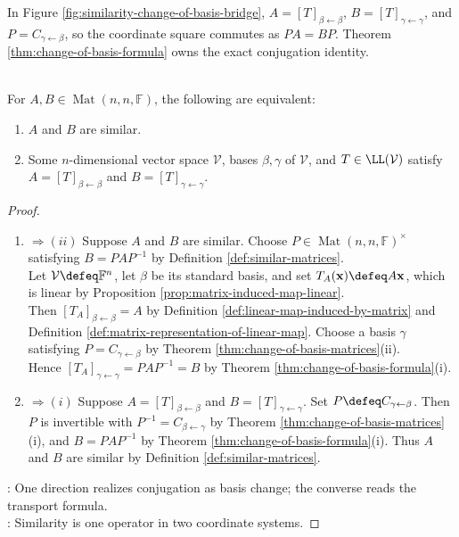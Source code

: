 In Figure \ref{fig:similarity-change-of-basis-bridge}, $A=[T]_{\beta\leftarrow\beta}$, $B=[T]_{\gamma\leftarrow\gamma}$, and $P=C_{\gamma\leftarrow\beta}$, so the coordinate square commutes as $PA=BP$. Theorem \ref{thm:change-of-basis-formula} owns the exact conjugation identity.

\begin{corollary} \label{cor:similar-iff-same-linear-operator} \\
For $A,B\in\operatorname{Mat}(n,n,\mathbb{F})$, the following are equivalent:
\begin{enumerate}[label=(\roman*)]
\setlength{\itemsep}{0pt}
\item $A$ and $B$ are similar.
\item Some $n$-dimensional vector space $\mathcal{V}$, bases $\beta,\gamma$ of $\mathcal{V}$, and $T\in\LL(\mathcal{V})$ satisfy $A=[T]_{\beta\leftarrow\beta}$ and $B=[T]_{\gamma\leftarrow\gamma}$.
\end{enumerate}
\begin{proof}
\begin{enumerate}[label=(\roman*)]
\setlength{\itemsep}{0pt}
\item[$(i)$] $\Rightarrow (ii)$ Suppose $A$ and $B$ are similar. Choose $P\in\operatorname{Mat}(n,n,\mathbb{F})^{\times}$ satisfying $B=PAP^{-1}$ by Definition \ref{def:similar-matrices}.\\
Let $\mathcal{V}\defeq\mathbb{F}^n$, let $\beta$ be its standard basis, and set $T_A(\mathbf{x})\defeq A\mathbf{x}$, which is linear by Proposition \ref{prop:matrix-induced-map-linear}.\\
Then $[T_A]_{\beta\leftarrow\beta}=A$ by Definition \ref{def:linear-map-induced-by-matrix} and Definition \ref{def:matrix-representation-of-linear-map}. Choose a basis $\gamma$ satisfying $P=C_{\gamma\leftarrow\beta}$ by Theorem \ref{thm:change-of-basis-matrices}(ii).\\
Hence $[T_A]_{\gamma\leftarrow\gamma}=PAP^{-1}=B$ by Theorem \ref{thm:change-of-basis-formula}(i).
\item[$(ii)$] $\Rightarrow (i)$ Suppose $A=[T]_{\beta\leftarrow\beta}$ and $B=[T]_{\gamma\leftarrow\gamma}$. Set $P\defeq C_{\gamma\leftarrow\beta}$. Then $P$ is invertible with $P^{-1}=C_{\beta\leftarrow\gamma}$ by Theorem \ref{thm:change-of-basis-matrices}(i), and $B=PAP^{-1}$ by Theorem \ref{thm:change-of-basis-formula}(i). Thus $A$ and $B$ are similar by Definition \ref{def:similar-matrices}.
\end{enumerate}
: One direction realizes conjugation as basis change; the converse reads the transport formula.\\
: Similarity is one operator in two coordinate systems.
\end{proof}
\end{corollary}

